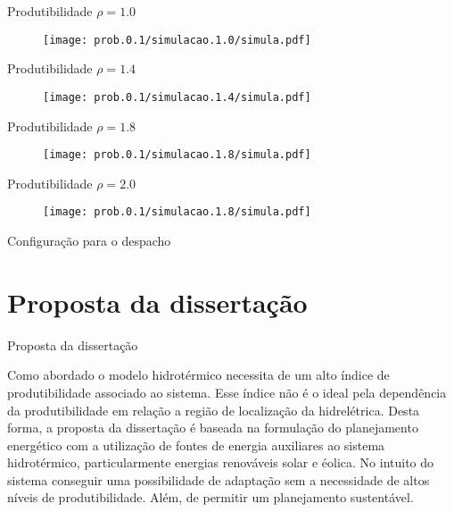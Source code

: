 \documentclass[12pt]{beamer}%
\begin{document}
\begin{frame}{Produtibilidade $\rho = 1.0$}
\begin{figure}[!ht]
	\centering
		\texttt{[image: prob.0.1/simulacao.1.0/simula.pdf]}
	\end{figure}
\end{frame}

\begin{frame}{Produtibilidade $\rho = 1.4$}
\begin{figure}[!ht]
	\centering
		\texttt{[image: prob.0.1/simulacao.1.4/simula.pdf]}
\end{figure}
\end{frame}

\begin{frame}{Produtibilidade $\rho = 1.8$}
\begin{figure}[!ht]
	\centering
		\texttt{[image: prob.0.1/simulacao.1.8/simula.pdf]}
\end{figure}
\end{frame}

\begin{frame}{Produtibilidade $\rho = 2.0$}
\begin{figure}[!ht]
	\centering
		\texttt{[image: prob.0.1/simulacao.1.8/simula.pdf]}
\end{figure}
\end{frame}
\begin{frame}{Configura\c c\~ao para o despacho}
	\begin{figure}[!ht]
		
	\end{figure}
\end{frame}

\section{Proposta da disserta\c c\~ao}
\begin{frame}{Proposta da disserta\c c\~ao}
	\begin{justify}	
		Como abordado o modelo hidrot\'ermico necessita de um alto
		\'indice de produtibilidade associado ao sistema. Esse \'indice n\~ao \'e o ideal pela depend\^encia da produtibilidade
		em rela\c c\~ao a regi\~ao de localiza\c c\~ao da hidrel\'etrica. Desta forma, a proposta da disserta\c c\~ao \'e baseada na
		formula\c c\~ao do planejamento energ\'etico com a utiliza\c c\~ao de fontes de energia auxiliares ao sistema
		hidrot\'ermico, particularmente energias renov\'aveis solar e \'eolica. No intuito do sistema conseguir uma possibilidade
		de adapta\c c\~ao sem a necessidade de altos n\'iveis de produtibilidade. Al\'em, de permitir um planejamento
		sustent\'avel.
	\end{justify}
\end{frame}
\end{document}
